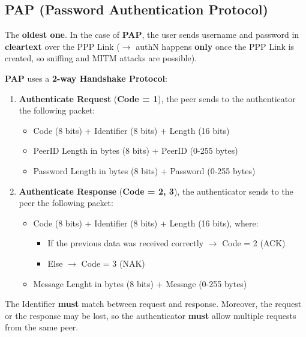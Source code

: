\subsection{PAP (Password Authentication Protocol)}
The \textbf{oldest one}. In the case of \textbf{PAP}, the user sends username and password in \textbf{cleartext} over the PPP Link (\(\rightarrow \) authN happens \textbf{only} once the PPP Link is created, so sniffing and MITM attacks are possible).
\vspace{-0.4cm}
\begin{center}
\begin{quotebox-grey}{\textbf{PAP} uses a \textbf{2-way Handshake Protocol}:}
    \begin{enumerate}
        \item \textbf{Authenticate Request} (\textbf{Code = 1}), the peer sends to the authenticator the following packet:
        \begin{itemize}
            \item Code (8 bits) + Identifier (8 bits) + Length (16 bits)
            \item PeerID Length in bytes (8 bits) + PeerID (0-255 bytes)
            \item Password Length in bytes (8 bits) + Password (0-255 bytes)
        \end{itemize}
        \item \textbf{Authenticate Response} (\textbf{Code = 2, 3}), the authenticator sends to the peer the following packet:
        \begin{itemize}
            \item Code (8 bits) + Identifier (8 bits) + Length (16 bits), where:
            \begin{itemize}
                \item If the previous data was received correctly \(\rightarrow \) Code = 2 (ACK)
                \item Else \(\rightarrow \) Code = 3 (NAK)
            \end{itemize}
            \item Message Lenght in bytes (8 bits) + Message (0-255 bytes)
        \end{itemize}
    \end{enumerate}
\end{quotebox-grey}
\end{center}
\noindent
The Identifier \textbf{must} match between request and response. Moreover, the request or the response may be lost, so the authenticator \textbf{must} allow multiple requests from the same peer.

